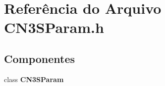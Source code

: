 \section{Referência do Arquivo C\+N3\+S\+Param.\+h}
\label{_c_n3_s_param_8h}
\subsection*{Componentes}
\begin{DoxyCompactItemize}
\item 
class {\bf C\+N3\+S\+Param}
\end{DoxyCompactItemize}
